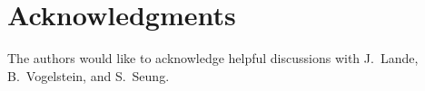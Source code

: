 \documentclass{article}
\newcommand{\mM}{\mathcal{M}}
\providecommand{\norm}[1]{\left \lVert#1 \right  \rVert}
\newcommand{\T}{^{\ensuremath{\mathsf{T}}}}           %
\begin{document}
% 



\section*{Acknowledgments}

The authors would like to acknowledge helpful discussions with J.~Lande, B.~Vogelstein, and S.~Seung. 


% 


\end{document}
